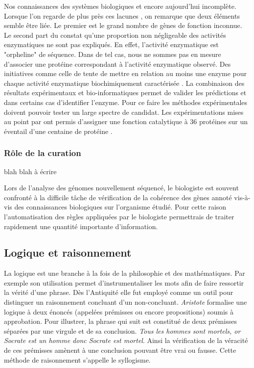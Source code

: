 \begin{refsegment}
    Nos connaissances des systèmes biologiques et encore aujourd'hui incomplète. Lorsque l'on regarde de plus près ces lacunes , on remarque que deux éléments semble être liée. Le premier est le grand nombre de gènes de fonction inconnue. Le second part du constat qu'une proportion non négligeable des activités enzymatiques ne sont pas expliqués. En effet, l'activité enzymatique est "orpheline" de séquence. Dans de tel cas, nous ne sommes pas en mesure d'associer une protéine correspondant à l'activité enzymatique observé. Des initiatives comme celle de \citeauthor{karp2004call} tente de mettre en relation au moins une enzyme pour chaque activité enzymatique biochimiquement caractérisée \cite{karp2004call}. La combinaison des résultats expérimentaux et bio-informatiques permet de valider les prédictions et dans certains cas d'identifier l'enzyme. Pour ce faire les méthodes expérimentales doivent pouvoir tester un large spectre de candidat. Les expérimentations mises au point par \citeauthor{kuznetsova2005enzyme} ont permis d'assigner une fonction catalytique à 36 protéines sur un éventail d'une centaine de protéine \cite{kuznetsova2005enzyme}. 
    
    
    \subsubsection{Rôle de la curation}
    
    blah blah à écrire
    
    Lors de l'analyse des génomes nouvellement séquencé, le biologiste est souvent confronté à la difficile tâche de vérification de la cohérence des gènes annoté vis-à-vis des connaissances biologiques sur l'organisme étudié. Pour cette raison l'automatisation des règles appliquées par le biologiste permettrais de traiter rapidement une quantité importante d'information.
    
    \subsection{Logique et raisonnement}
    
    La logique est une branche à la fois de la philosophie et des mathématiques. Par exemple son utilisation permet d'instrumentaliser les mots afin de faire ressortir la vérité d'une phrase. Dès l'Antiquité elle fut employé comme un outil pour distinguer un raisonnement concluant d'un non-concluant. \textit{Aristote} formalise une logique à deux énoncés (appelées prémisses ou encore propositions) soumis à approbation. Pour illustrer, la phrase qui suit est constitué de deux prémisses séparées par une virgule et de sa conclusion. \textit{Tous les hommes sont mortels, or Socrate est un homme donc Socrate est mortel}. Ainsi la vérification de la véracité de ces prémisses amènent à une conclusion pouvant être vrai ou fausse. Cette méthode de raisonnement s'appelle le syllogisme.
    

\end{refsegment}
